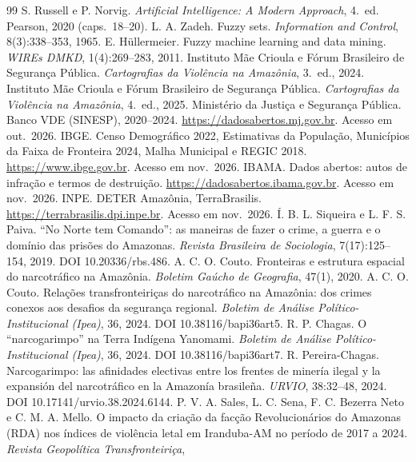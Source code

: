 \documentclass[10pt,a4paper,twocolumn]{article}
\begin{document}
\begin{thebibliography}{99}\footnotesize
\setlength{\itemsep}{0pt}
 S. Russell e P. Norvig. \emph{Artificial Intelligence: A Modern Approach}, 4.\ ed.
Pearson, 2020 (caps.\ 18--20).
 L. A. Zadeh. Fuzzy sets. \emph{Information and Control}, 8(3):338--353, 1965.
 E. Hüllermeier. Fuzzy machine learning and data mining. \emph{WIREs DMKD},
1(4):269--283, 2011.
 Instituto Mãe Crioula e Fórum Brasileiro de Segurança Pública.
\emph{Cartografias da Violência na Amazônia}, 3.\ ed., 2024.
 Instituto Mãe Crioula e Fórum Brasileiro de Segurança Pública.
\emph{Cartografias da Violência na Amazônia}, 4.\ ed., 2025.
 Ministério da Justiça e Segurança Pública. Banco VDE (SINESP), 2020--2024.
\url{https://dadosabertos.mj.gov.br}. Acesso em out.\ 2026.
 IBGE. Censo Demográfico 2022, Estimativas da População, Municípios da Faixa de
Fronteira 2024, Malha Municipal e REGIC 2018. \url{https://www.ibge.gov.br}. Acesso em nov.\
2026.
 IBAMA. Dados abertos: autos de infração e termos de destruição.
\url{https://dadosabertos.ibama.gov.br}. Acesso em nov.\ 2026.
 INPE. DETER Amazônia, TerraBrasilis. \url{https://terrabrasilis.dpi.inpe.br}.
Acesso em nov.\ 2026.
 Í. B. L. Siqueira e L. F. S. Paiva. ``No Norte tem Comando'': as maneiras de
fazer o crime, a guerra e o domínio das prisões do Amazonas. \emph{Revista Brasileira de
Sociologia}, 7(17):125--154, 2019. DOI 10.20336/rbs.486.
 A. C. O. Couto. Fronteiras e estrutura espacial do narcotráfico na Amazônia.
\emph{Boletim Gaúcho de Geografia}, 47(1), 2020.
 A. C. O. Couto. Relações transfronteiriças do narcotráfico na Amazônia: dos
crimes conexos aos desafios da segurança regional. \emph{Boletim de Análise
Político-Institucional (Ipea)}, 36, 2024. DOI 10.38116/bapi36art5.
\bibitem{r13} R. P. Chagas. O ``narcogarimpo'' na Terra Indígena Yanomami. \emph{Boletim de
Análise Político-Institucional (Ipea)}, 36, 2024. DOI 10.38116/bapi36art7.
\bibitem{r14} R. Pereira-Chagas. Narcogarimpo: las afinidades electivas entre los frentes de
minería ilegal y la expansión del narcotráfico en la Amazonía brasileña. \emph{URVIO},
38:32--48, 2024. DOI 10.17141/urvio.38.2024.6144.
 P. V. A. Sales, L. C. Sena, F. C. Bezerra Neto e C. M. A. Mello. O impacto da
criação da facção Revolucionários do Amazonas (RDA) nos índices de violência letal em
Iranduba-AM no período de 2017 a 2024. \emph{Revista Geopolítica Transfronteiriça},

\end{thebibliography}
\end{document}
